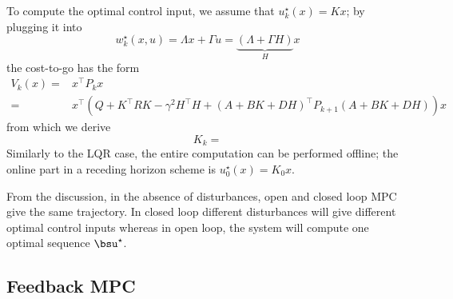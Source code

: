 To compute the optimal control input, we assume that $u_k^\star(x)=Kx$; by plugging it into
\begin{equation*}
  w_k^\star(x,u) = \Lambda x + \Gamma u = \underbrace{(\Lambda + \Gamma H)}_{H}x
\end{equation*}
the cost-to-go has the form
\begin{align*}
  V_k(x) =& x^\top P_kx \\
  =& x^\top\left(Q + K^\top RK -\gamma^2 H^\top H + (A+BK+DH)^\top P_{k+1}(A+BK+DH)\right)x
\end{align*}
from which we derive
\begin{equation*}
  K_k =
\end{equation*}
Similarly to the LQR case, the entire computation can be performed offline; the online part in a receding horizon scheme is $u_0^\star(x) = K_0x$.

From the discussion, in the absence of disturbances, open and closed loop MPC give the same trajectory. In closed loop different disturbances will give different optimal control inputs whereas in open loop, the system will compute one optimal sequence $\bsu^\star$.

\subsection{Feedback MPC}
\label{sec:feedback-MPC}

